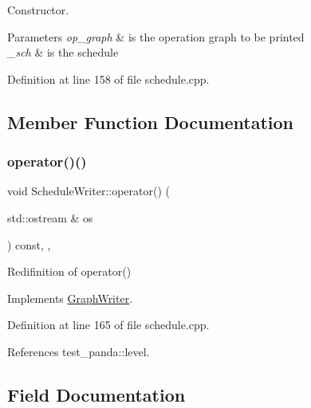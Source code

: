 Constructor. 


\begin{DoxyParams}{Parameters}
{\em op\+\_\+graph} & is the operation graph to be printed \\
\hline
{\em \+\_\+sch} & is the schedule \\
\hline
\end{DoxyParams}


Definition at line 158 of file schedule.\+cpp.



\subsection{Member Function Documentation}
\mbox{\label{classScheduleWriter_a31d2744418a5d0fa5fa1ac01acde3052}} 
\subsubsection{\texorpdfstring{operator()()}{operator()()}}
{\footnotesize\ttfamily void Schedule\+Writer\+::operator() (\begin{DoxyParamCaption}\item[{std\+::ostream \&}]{os }\end{DoxyParamCaption}) const\hspace{0.3cm}{\ttfamily [inline]}, {\ttfamily [override]}, {\ttfamily [virtual]}}



Redifinition of operator() 



Implements \hyperlink{classGraphWriter_ae5b82438e8bf837f7a0f05b9df648b69}{Graph\+Writer}.



Definition at line 165 of file schedule.\+cpp.



References test\+\_\+panda\+::level.



\subsection{Field Documentation}
\mbox{\label{classScheduleWriter_a3b318965422ea1d91f1ddd17708e07ef}} 

